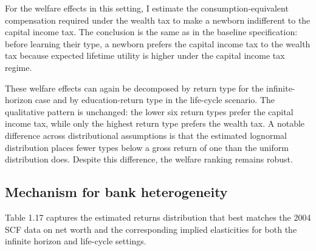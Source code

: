 \unskip
\unskip

\par For the welfare effects in this setting, I estimate the consumption-equivalent compensation required under the wealth tax to make a newborn indifferent to the capital income tax. The conclusion is the same as in the baseline specification: before learning their type, a newborn prefers the capital income tax to the wealth tax because expected lifetime utility is higher under the capital income tax regime.



\par These welfare effects can again be decomposed by return type for the infinite-horizon case and by education-return type in the life-cycle scenario. The qualitative pattern is unchanged: the lower six return types prefer the capital income tax, while only the highest return type prefers the wealth tax. A notable difference across distributional assumptions is that the estimated lognormal distribution places fewer types below a gross return of one than the uniform distribution does. Despite this difference, the welfare ranking remains robust.





\FloatBarrier

\subsection{Mechanism for bank heterogeneity}

  \par Table 1.17 captures the estimated returns distribution that best matches the 2004 SCF data on net worth and the corresponding implied elasticities for both the infinite horizon and life-cycle settings.  

   
